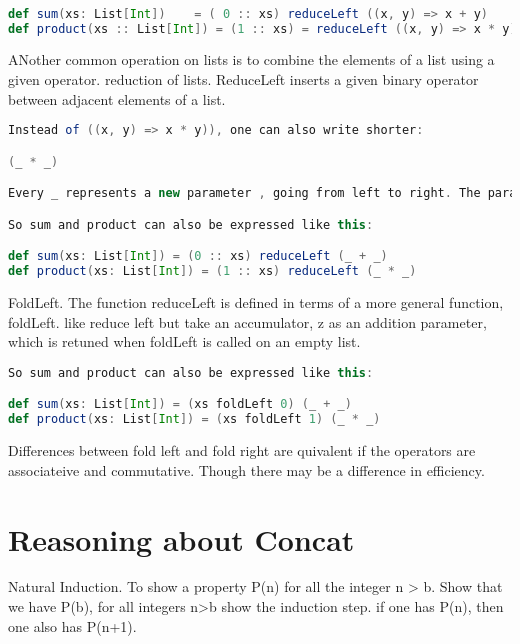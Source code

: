 \documentclass[10pt, a4paper]{report}
\begin{document}
\begin{lstlisting}[language=scala]

def sum(xs: List[Int])    = ( 0 :: xs) reduceLeft ((x, y) => x + y)
def product(xs :: List[Int]) = (1 :: xs) = reduceLeft ((x, y) => x * y)

\end{lstlisting}

ANother common operation on lists is to combine the elements of a list using a given operator. reduction of lists. ReduceLeft inserts a given binary operator between adjacent elements of a list. 

\begin{lstlisting}[language=scala]
Instead of ((x, y) => x * y)), one can also write shorter:

(_ * _)

Every _ represents a new parameter , going from left to right. The parameters are defined at the next outer pair of parentheses ( or the whole expression if there are no enclosing parentheses).

So sum and product can also be expressed like this:

def sum(xs: List[Int]) = (0 :: xs) reduceLeft (_ + _)
def product(xs: List[Int]) = (1 :: xs) reduceLeft (_ * _)

\end{lstlisting}

FoldLeft. The function reduceLeft is defined in terms of a more general function, foldLeft. like reduce left but take an accumulator, z as an addition parameter, which is retuned when foldLeft is called on an empty list.

\begin{lstlisting}[language=scala]
So sum and product can also be expressed like this:

def sum(xs: List[Int]) = (xs foldLeft 0) (_ + _)
def product(xs: List[Int]) = (xs foldLeft 1) (_ * _)

\end{lstlisting}

Differences between fold left and fold right are quivalent if the operators are associateive and commutative. Though there may be a difference in efficiency.  

\section{Reasoning about Concat}

 Natural Induction. To show a property P(n) for all the integer n > b. Show that we have P(b), for all integers n>b show the induction step. if one has P(n), then one also has P(n+1).
 
\end{document}
